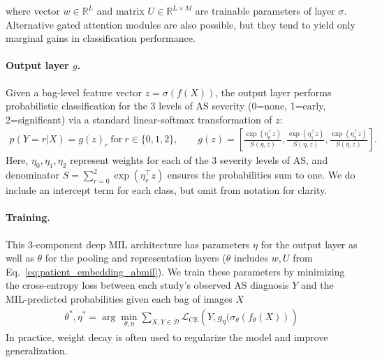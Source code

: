 where vector $w \in \mathbb{R}^{L}$ and matrix $U \in \mathbb{R}^{L \times M}$ are trainable parameters of layer $\sigma$. Alternative gated attention modules are also possible, but they tend to yield only marginal gains in classification performance.

\paragraph{Output layer $g$.} Given a bag-level feature vector $z = \sigma(f(X))$, the output layer performs probabilistic classification for the 3 levels of AS severity (0=none, 1=early, 2=significant) via a standard linear-softmax transformation of $z$:
\begin{align}
    p( Y = r | X) = g(z)_r ~\text{for}~ r \in \{0,1,2\}, \qquad g(z) = 
    \left[
    \frac{\exp( \eta_0^{\top} z)}{S(\eta,z)}, \frac{\exp( \eta_1^{\top} z)}{S(\eta,z)}, \frac{\exp( \eta_2^{\top} z)}{S(\eta,z)}
    \right].
\end{align}
Here, $\eta_0, \eta_1, \eta_2$ represent weights for each of the 3 severity levels of AS, and denominator $S = \sum_{r=0}^2 \exp( \eta_r^{\top} z)$ ensures the probabilities sum to one. We do include an intercept term for each class, but omit from notation for clarity.

\paragraph{Training.}
This 3-component deep MIL architecture has parameters $\eta$ for the output layer as well as $\theta$ for the pooling and representation layers ($\theta$ includes $w, U$ from Eq.~\eqref{eq:patient_embedding_abmil}).
We train these parameters by minimizing the cross-entropy loss between each study's observed AS diagnosis $Y$ and the MIL-predicted probabilities given each bag of images $X$ 
\begin{align}
    \theta^*, \eta^* = \arg\!\min_{\theta, \eta} \sum_{X, Y \in \mathcal{D}} \mathcal{L}_{\text{CE}}\left( Y, g_{\eta}( \sigma_{\theta}( f_{\theta}(X) ) \right) 
\end{align}
In practice, weight decay is often used to regularize the model and improve generalization.



